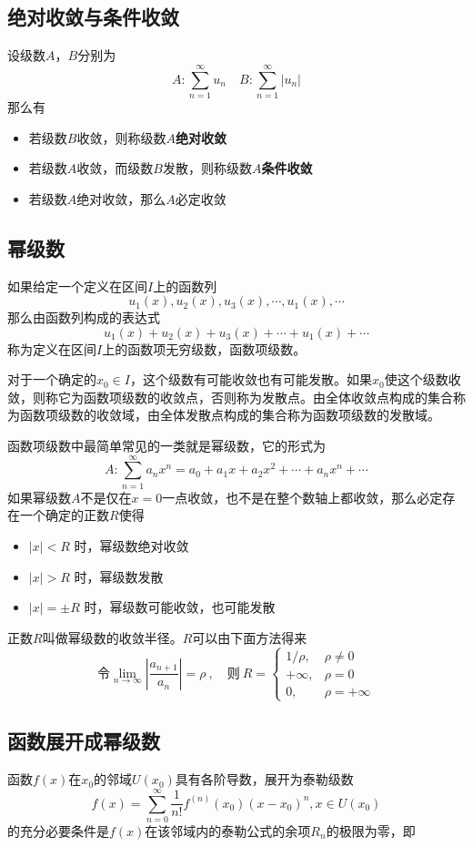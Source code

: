 \subsection{绝对收敛与条件收敛}
设级数$A$，$B$分别为
\[A:\sum_{n=1}^\infty u_n\quad B:\sum_{n=1}^\infty |u_n|\]
那么有
\begin{itemize}[nosep,left=2em]
    \item 若级数$B$收敛，则称级数$A${\bfseries 绝对收敛}
    \item 若级数$A$收敛，而级数$B$发散，则称级数$A${\bfseries 条件收敛}
    \item 若级数$A$绝对收敛，那么$A$必定收敛
\end{itemize}
\subsection{幂级数}
如果给定一个定义在区间$I$上的函数列
\[u_1(x),u_2(x),u_3(x),\cdots,u_1(x),\cdots\]
那么由函数列构成的表达式
\[u_1(x)+u_2(x)+u_3(x)+\cdots+u_1(x)+\cdots\]
称为定义在区间$I$上的函数项无穷级数，函数项级数。

对于一个确定的$x_0\in I$，这个级数有可能收敛也有可能发散。如果$x_0$使这个级数收敛，则称它为函数项级数的收敛点，否则称为发散点。由全体收敛点构成的集合称为函数项级数的收敛域，由全体发散点构成的集合称为函数项级数的发散域。

函数项级数中最简单常见的一类就是幂级数，它的形式为
\[A:\sum_{n=1}^\infty a_n x^n=a_0+a_1x+a_2x^2+\cdots+a_nx^n+\cdots\]
如果幂级数$A$不是仅在$x=0$一点收敛，也不是在整个数轴上都收敛，那么必定存在一个确定的正数$R$使得
\begin{itemize}[nosep,left=2em]
    \item $|x|<R$ 时，幂级数绝对收敛
    \item $|x|>R$ 时，幂级数发散
    \item $|x|=\pm R$ 时，幂级数可能收敛，也可能发散
\end{itemize}
正数$R$叫做幂级数的收敛半径。$R$可以由下面方法得来
\[\text{令}\lim_{n\to\infty}\left| \frac{a_{n+1}}{a_n}\right|=\rho\ ,\quad\text{则}\ %
R=\begin{cases}
  1/\rho,&\rho\ne0\\
  +\infty,&\rho=0\\
  0,&\rho=+\infty  
\end{cases}\]
\subsection{函数展开成幂级数}
函数$f(x)$在$x_0$的邻域$U(x_0)$具有各阶导数，展开为泰勒级数
\[f(x)=\sum_{n=0}^\infty \frac{1}{n!}f^{(n)}(x_0)(x-x_0)^n,x\in U(x_0)\]
的充分必要条件是$f(x)$在该邻域内的泰勒公式的余项$R_n$的极限为零，即

